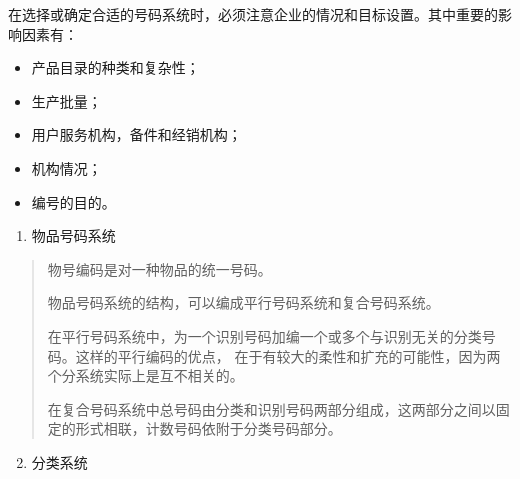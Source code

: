 \documentclass[letterpaper,10pt,english]{sphinxmanual}
\begin{document}
在选择或确定合适的号码系统时，必须注意企业的情况和目标设置。其中重要的影响因素有：
\begin{itemize}
\item {} 
产品目录的种类和复杂性；

\item {} 
生产批量；

\item {} 
用户服务机构，备件和经销机构；

\item {} 
机构情况；

\item {} 
编号的目的。

\end{itemize}
\begin{enumerate}
\item {} 
物品号码系统

\end{enumerate}
\begin{quote}

物号编码是对一种物品的统一号码。

物品号码系统的结构，可以编成平行号码系统和复合号码系统。

在平行号码系统中，为一个识别号码加编一个或多个与识别无关的分类号码。这样的平行编码的优点，
在于有较大的柔性和扩充的可能性，因为两个分系统实际上是互不相关的。

在复合号码系统中总号码由分类和识别号码两部分组成，这两部分之间以固定的形式相联，计数号码依附于分类号码部分。
\end{quote}
\begin{enumerate}
\setcounter{enumi}{1}
\item {} 
分类系统

\end{enumerate}
\end{document}
